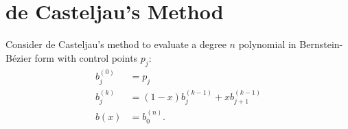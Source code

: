 \documentclass[letterpaper,10pt]{article}
\begin{document}
\tableofcontents

\section{de Casteljau's Method}

Consider de Casteljau's method to evaluate a degree \(n\)
polynomial in Bernstein-B\'{e}zier form with control points \(p_j\):
\begin{align*}
    b_j^{(0)} &= p_j \\
    b_j^{(k)} &= (1 - x) b_j^{(k - 1)} + x b_{j + 1}^{(k - 1)} \\
    b(x) &= b_0^{(n)}.
\end{align*}
\end{document}
